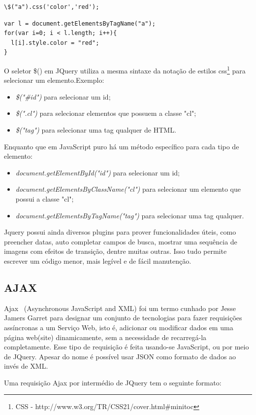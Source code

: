 \begin{verbatim}
\$("a").css('color','red');
\end{verbatim}

\begin{verbatim}
var l = document.getElementsByTagName("a");
for(var i=0; i < l.length; i++){
  l[i].style.color = "red";
}

\end{verbatim}

O seletor \$() em JQuery utiliza a mesma sintaxe da notação de estilos css\footnote{CSS - http://www.w3.org/TR/CSS21/cover.html\#minitoc} para selecionar um elemento.Exemplo:

\begin{itemize}
\item \emph{\$("\#id")} para selecionar um id;
\item \emph{\$(".cl")} para selecionar elementos que possuem a classe "cl";
\item \emph{\$("tag")} para selecionar uma tag qualquer de HTML.
\end{itemize}

Enquanto que em JavaScript puro há um método específico para cada tipo de elemento:
\begin{itemize}
\item  \emph{document.getElementById("id")} para selecionar um id;
\item  \emph{document.getElementsByClassName("cl")} para selecionar um elemento que possui a classe "cl";
\item  \emph{document.getElementsByTagName("tag")} para selecionar uma tag qualquer.
\end{itemize}

Jquery possui ainda diversos plugins para prover funcionalidades úteis, como preencher datas, auto completar campos de busca, mostrar uma sequência de imagens com efeitos de transição, dentre muitas outras. Isso tudo permite escrever um código menor, mais legível e de fácil manutenção.

\subsection{AJAX}
\label{sub:aj}
Ajax~\cite{ajax} (Asynchronous JavaScript and XML) foi um termo cunhado por Jesse Jamers Garret para designar um conjunto de tecnologias para fazer requisições assíncronas a um Serviço Web, isto é, adicionar ou modificar dados em uma página web(site) dinamicamente, sem a necessidade de recarregá-la completamente. Esse tipo de requisição é feita usando-se JavaScript, ou por meio de JQuery. Apesar do nome é possível usar JSON como formato de dados ao invés de XML.
\par
Uma requisição Ajax por intermédio de JQuery tem o seguinte formato:

